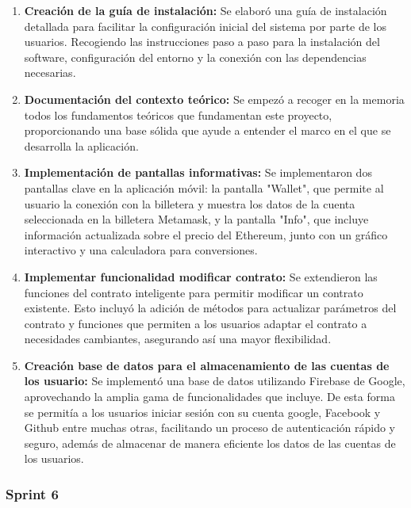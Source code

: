 \begin{enumerate}

\item \textbf{Creación de la guía de instalación:} Se elaboró una guía de instalación detallada para facilitar la configuración inicial del sistema por parte de los usuarios. Recogiendo las instrucciones paso a paso para la instalación del software, configuración del entorno y la conexión con las dependencias necesarias.

\item \textbf{Documentación del contexto teórico:}  Se empezó a recoger en la memoria todos los fundamentos teóricos que fundamentan este proyecto, proporcionando una base sólida que ayude a entender el marco en el que se desarrolla la aplicación. 

\item \textbf{Implementación de pantallas informativas:} Se implementaron dos pantallas clave en la aplicación móvil: la pantalla "Wallet", que permite al usuario la conexión con la billetera y muestra los datos de la cuenta seleccionada en la billetera Metamask, y la pantalla "Info", que incluye información actualizada sobre el precio del Ethereum, junto con un gráfico interactivo y una calculadora para conversiones.

\item \textbf{Implementar funcionalidad modificar contrato:} Se extendieron las funciones del contrato inteligente para permitir modificar un contrato existente. Esto incluyó la adición de métodos para actualizar parámetros del contrato y funciones que permiten a los usuarios adaptar el contrato a necesidades cambiantes, asegurando así una mayor flexibilidad.

\item \textbf{Creación base de datos para el almacenamiento de las cuentas de los usuario:}  Se implementó una base de datos utilizando Firebase de Google, aprovechando la amplia gama de funcionalidades que incluye. De esta forma se permitía a los usuarios iniciar sesión con su cuenta google, Facebook y Github entre muchas otras, facilitando un proceso de autenticación rápido y seguro, además de almacenar de manera eficiente los datos de las cuentas de los usuarios.

\end{enumerate}


\subsubsection{Sprint 6}

